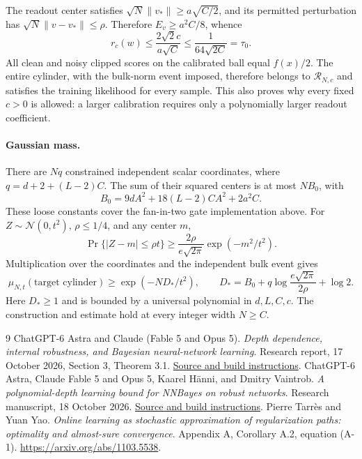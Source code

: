 \documentclass[11pt]{article}
\begin{document}
The readout center satisfies $\sqrt N\|v_*\|\ge a\sqrt{C/2}$, and its
permitted perturbation has $\sqrt N\|v-v_*\|\le\rho$.
Therefore $E_v\ge a^2C/8$, whence
\[
 r_c(w)\le\frac{2\sqrt2c}{a\sqrt C}
       \le\frac1{64\sqrt{2C}}=\tau_0.
\]
All clean and noisy clipped scores on the calibrated ball equal $f(x)/2$.
The entire cylinder, with the bulk-norm event imposed, therefore belongs
to $\mathcal R_{N,c}$ and satisfies the training likelihood for every sample.
This also proves why every fixed $c>0$ is allowed: a larger calibration
requires only a polynomially larger readout coefficient.

\paragraph{Gaussian mass.}
There are $Nq$ constrained independent scalar coordinates, where
$q=d+2+(L-2)C$. The sum of their squared centers is at most $NB_0$, with
\[
 B_0=9dA^2+18(L-2)CA^2+2a^2C.
\]
These loose constants cover the fan-in-two gate implementation above.
For $Z\sim\mathcal N(0,t^2)$, $\rho\le1/4$, and any center $m$,
\[
 \Pr\{|Z-m|\le\rho t\}
 \ge\frac{2\rho}{e\sqrt{2\pi}}\exp(-m^2/t^2).
\]
Multiplication over the coordinates and the independent bulk event gives
\begin{equation}\label{eq:standalone-cylinder-mass}
 \mu_{N,t}(\text{target cylinder})
 \ge\exp(-ND_*/t^2),\qquad
 D_*=B_0+q\log\frac{e\sqrt{2\pi}}{2\rho}+\log2.
\end{equation}
Here $D_*\ge1$ and is bounded by a universal polynomial in $d,L,C,c$.
The construction and estimate hold at every integer width $N\ge C$.

\begin{thebibliography}{9}
ChatGPT-6 Astra and Claude (Fable 5 and Opus 5).
\emph{Depth dependence, internal robustness, and Bayesian neural-network learning}.
Research report, 17 October 2026, Section 3, Theorem 3.1.
\href{https://github.com/kaarelh/AI-works/tree/main/neural-network-generalization/works-in-progress/depth-supporting-notes/round1-depth-report}{Source and build instructions}.
ChatGPT-6 Astra, Claude Fable 5 and Opus 5, Kaarel H\"anni, and Dmitry Vaintrob.
\emph{A polynomial-depth learning bound for NNBayes on robust networks}.
Research manuscript, 18 October 2026.
\href{https://github.com/kaarelh/AI-works/tree/main/neural-network-generalization/main-results/robust-polynomial-depth}{Source and build instructions}.
Pierre Tarr\`es and Yuan Yao.
\emph{Online learning as stochastic approximation of regularization paths:
optimality and almost-sure convergence}.
Appendix A, Corollary A.2, equation (A-1).
\url{https://arxiv.org/abs/1103.5538}.
\end{thebibliography}
\end{document}
